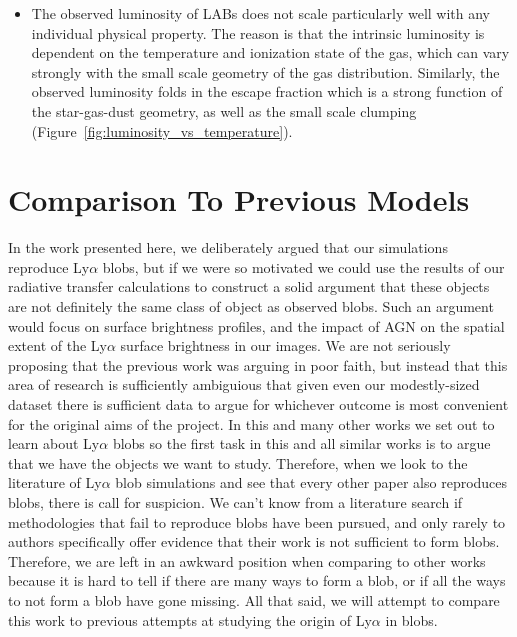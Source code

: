 \begin{itemize}
    \item The observed luminosity of LABs does not scale particularly well with any individual physical property.  The reason is that the intrinsic luminosity is dependent on the temperature and ionization state of the gas, which can vary strongly with the small scale geometry of the gas distribution.  Similarly, the observed luminosity folds in the escape fraction which is a strong function of the star-gas-dust geometry, as well as the small scale clumping  (Figure~\ref{fig:luminosity_vs_temperature}).
    
\end{itemize}


\section{Comparison To Previous Models}
 In the work presented here, we deliberately argued that our simulations reproduce Ly$\alpha$ blobs, but if we were so motivated we could use the results of our radiative transfer calculations to construct a solid argument that these objects are not definitely the same class of object as observed blobs.
Such an argument would focus on surface brightness profiles, and the impact of AGN on the spatial extent of the Ly$\alpha$ surface brightness in our images.
We are not seriously proposing that the previous work was arguing in poor faith, but instead that this area of research is sufficiently ambiguious that given even our modestly-sized dataset there is sufficient data to argue for whichever outcome is most convenient for the original aims of the project.
In this and many other works we set out to learn about Ly$\alpha$ blobs so the first task in this and all similar works is to argue that we have the objects we want to study.
Therefore, when we look to the literature of Ly$\alpha$ blob simulations and see that every other paper also reproduces blobs, there is call for suspicion.
We can't know from a literature search if methodologies that fail to reproduce blobs have been pursued, and only rarely to authors specifically offer evidence that their work is not sufficient to form blobs.
Therefore, we are left in an awkward position when comparing to other works because it is hard to tell if there are many ways to form a blob, or if all the ways to not form a blob have gone missing.
All that said, we will attempt to compare this work to previous attempts at studying the origin of Ly$\alpha$ in blobs.

